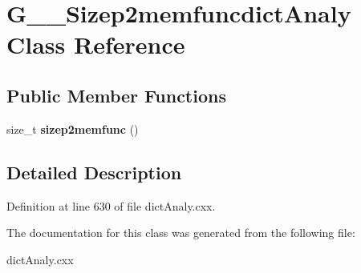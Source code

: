 \hypertarget{classG____Sizep2memfuncdictAnaly}{
\section{G\_\-\_\-Sizep2memfuncdictAnaly Class Reference}
\label{classG____Sizep2memfuncdictAnaly}
}
\subsection*{Public Member Functions}
\begin{DoxyCompactItemize}
\item 
\hypertarget{classG____Sizep2memfuncdictAnaly_a91bdc3352b3b18195e6eee2285e4b47c}{
size\_\-t {\bfseries sizep2memfunc} ()}
\label{classG____Sizep2memfuncdictAnaly_a91bdc3352b3b18195e6eee2285e4b47c}

\end{DoxyCompactItemize}


\subsection{Detailed Description}


Definition at line 630 of file dictAnaly.cxx.



The documentation for this class was generated from the following file:\begin{DoxyCompactItemize}
\item 
dictAnaly.cxx\end{DoxyCompactItemize}
